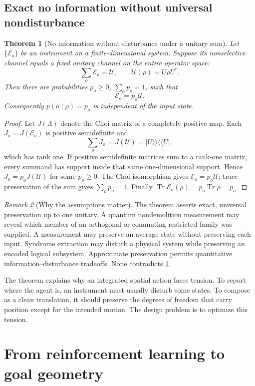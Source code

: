 \documentclass[11pt]{article}
\newtheorem{theorem}{Theorem}[section]
\theoremstyle{definition}
\theoremstyle{remark}
\newtheorem{remark}[theorem]{Remark}
\newcommand{\cE}{\mathcal E}
\newcommand{\cU}{\mathcal U}
\newcommand{\Tr}{\operatorname{Tr}}
\begin{document}
\subsection{Exact no information without universal nondisturbance}

\begin{theorem}[No information without disturbance under a unitary sum]
\label{thm:noinfo}
Let \(\{\cE_o\}\) be an instrument on a finite-dimensional system. Suppose its
nonselective channel equals a fixed unitary channel on the entire operator
space:
\[
\sum_o\cE_o=\cU,\qquad \cU(\rho)=U\rho U^\dagger.
\]
Then there are probabilities \(p_o\ge0\), \(\sum_op_o=1\), such that
\[
\cE_o=p_o\cU.
\]
Consequently \(p(o\mid\rho)=p_o\) is independent of the input state.
\end{theorem}
\begin{proof}
Let \(J(\Lambda)\) denote the Choi matrix of a completely positive map. Each
\(J_o=J(\cE_o)\) is positive semidefinite and
\[
\sum_oJ_o=J(\cU)=|U\rangle\!\rangle\langle\!\langle U|,
\]
which has rank one. If positive semidefinite matrices sum to a rank-one
matrix, every summand has support inside that same one-dimensional support.
Hence \(J_o=p_oJ(\cU)\) for some \(p_o\ge0\). The Choi isomorphism gives
\(\cE_o=p_o\cU\); trace preservation of the sum gives \(\sum_op_o=1\).
Finally \(\Tr\cE_o(\rho)=p_o\Tr\rho=p_o\).
\end{proof}

\begin{remark}[Why the assumptions matter]
The theorem asserts exact, universal preservation up to one unitary. A
quantum nondemolition measurement may reveal which member of an orthogonal or
commuting restricted family was supplied. A measurement may preserve an
average state without preserving each input. Syndrome extraction may disturb
a physical system while preserving an encoded logical subsystem. Approximate
preservation permits quantitative information--disturbance tradeoffs. None
contradicts \cref{thm:noinfo}.
\end{remark}

The theorem explains why an integrated spatial action faces tension. To
report where the agent is, an instrument must usually disturb some states. To
compose as a clean translation, it should preserve the degrees of freedom
that carry position except for the intended motion. The design problem is to
optimize this tension.

\section{From reinforcement learning to goal geometry}
\end{document}
